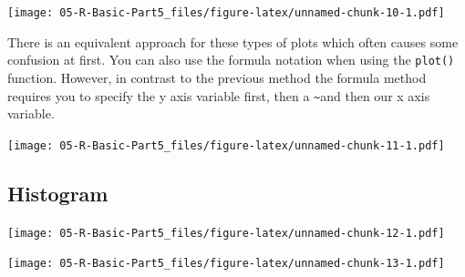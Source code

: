 \documentclass[
]{book}
\newenvironment{Shaded}{\begin{snugshade}}{\end{snugshade}}
\newcommand{\AttributeTok}[1]{\textcolor[rgb]{0.13,0.29,0.53}{#1}}
\newcommand{\DecValTok}[1]{\textcolor[rgb]{0.00,0.00,0.81}{#1}}
\newcommand{\FunctionTok}[1]{\textcolor[rgb]{0.13,0.29,0.53}{\textbf{#1}}}
\newcommand{\NormalTok}[1]{#1}
\newcommand{\OtherTok}[1]{\textcolor[rgb]{0.56,0.35,0.01}{#1}}
\newcommand{\SpecialCharTok}[1]{\textcolor[rgb]{0.81,0.36,0.00}{\textbf{#1}}}
\newcommand{\StringTok}[1]{\textcolor[rgb]{0.31,0.60,0.02}{#1}}
\begin{document}
\texttt{[image: 05-R-Basic-Part5\_files/figure-latex/unnamed-chunk-10-1.pdf]}

There is an equivalent approach for these types of plots which often causes some confusion at first. You can also use the formula notation when using the \texttt{plot()} function. However, in contrast to the previous method the formula method requires you to specify the y axis variable first, then a \texttt{\textasciitilde{}}and then our x axis variable.

\begin{Shaded}
\end{Shaded}

\texttt{[image: 05-R-Basic-Part5\_files/figure-latex/unnamed-chunk-11-1.pdf]}

\subsection*{Histogram}\label{histogram}

\begin{Shaded}
\end{Shaded}

\texttt{[image: 05-R-Basic-Part5\_files/figure-latex/unnamed-chunk-12-1.pdf]}

\begin{Shaded}
\end{Shaded}

\texttt{[image: 05-R-Basic-Part5\_files/figure-latex/unnamed-chunk-13-1.pdf]}
\end{document}
